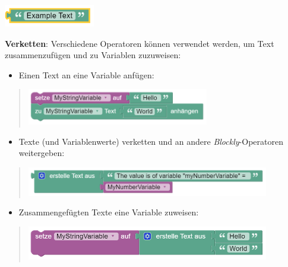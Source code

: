 \documentclass[
  letterpaper,
  DIV=11]{scrreprt}
\providecommand{\tightlist}{%
  \setlength{\itemsep}{0pt}\setlength{\parskip}{0pt}}\usepackage{longtable,booktabs,array}
\begin{document}
\begin{tcolorbox}
\includegraphics[width=1.5625in,height=\textheight]{img/screenshot-blockly-text-string-01-ENG.png}

\textbf{Verketten}: Verschiedene Operatoren können verwendet werden, um
Text zusammenzufügen und zu Variablen zuzuweisen:

\begin{itemize}
\tightlist
\item
  Einen Text an eine Variable anfügen:
\end{itemize}

\begin{quote}
\includegraphics[width=3.125in,height=\textheight]{img/screenshot-blockly-text-string-merge-example-01-DEU.png}
\end{quote}

\begin{itemize}
\tightlist
\item
  Texte (und Variablenwerte) verketten und an andere
  \emph{Blockly}-Operatoren weitergeben:
\end{itemize}

\begin{quote}
\includegraphics[width=4.16667in,height=\textheight]{img/screenshot-blockly-text-create-text-using-variables-01-DEU.png}
\end{quote}

\begin{itemize}
\tightlist
\item
  Zusammengefügten Texte eine Variable zuweisen:
\end{itemize}

\begin{quote}
\includegraphics[width=4.16667in,height=\textheight]{img/screenshot-blockly-text-create-text-using-variables-02-DEU.png}
\end{quote}


\end{tcolorbox}
\end{document}
